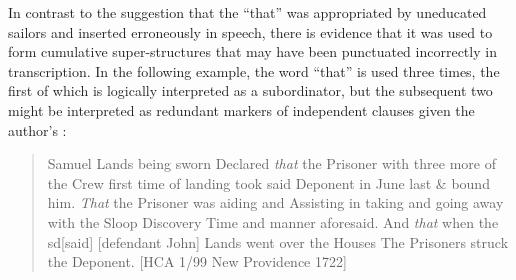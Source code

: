 In contrast to the suggestion that the  “that” was appropriated by uneducated sailors and inserted erroneously in speech, there is evidence that it was used to form cumulative super-structures that may have been punctuated incorrectly in transcription. In the following example, the word “that” is used three times, the first of which is logically interpreted as a subordinator, but the subsequent two might be interpreted as redundant markers of independent clauses given the author’s :

\begin{quotation}
Samuel Lands being sworn Declared \textit{that} the Prisoner with three more of the Crew first time of landing took said Deponent in June last \& bound him. \textit{That} the Prisoner was aiding and Assisting in taking and going away with the Sloop Discovery Time and manner aforesaid. And \textit{that} when the sd[said] [defendant John] Lands went over the Houses The Prisoners struck the Deponent. [HCA 1/99 New Providence 1722] 
\end{quotation}

